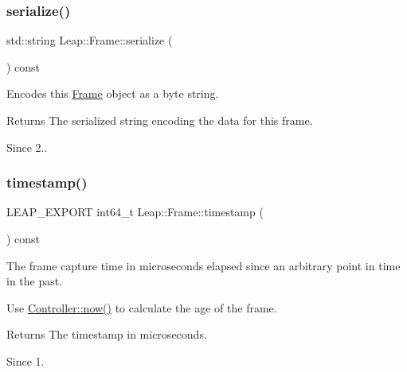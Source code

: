 \subsubsection{\texorpdfstring{serialize()}{serialize()}}
{\footnotesize\ttfamily std\+::string Leap\+::\+Frame\+::serialize (\begin{DoxyParamCaption}{ }\end{DoxyParamCaption}) const\hspace{0.3cm}{\ttfamily [inline]}}

Encodes this \hyperlink{class_leap_1_1_frame}{Frame} object as a byte string.


\begin{DoxyCodeInclude}
\end{DoxyCodeInclude}


\begin{DoxyReturn}{Returns}
The serialized string encoding the data for this frame. 
\end{DoxyReturn}
\begin{DoxySince}{Since}
2.. 
\end{DoxySince}
\mbox{\label{class_leap_1_1_frame_a4bcd369dfb07662f074d3fb36902ac70}} 
\subsubsection{\texorpdfstring{timestamp()}{timestamp()}}
{\footnotesize\ttfamily L\+E\+A\+P\+\_\+\+E\+X\+P\+O\+RT int64\+\_\+t Leap\+::\+Frame\+::timestamp (\begin{DoxyParamCaption}{ }\end{DoxyParamCaption}) const}

The frame capture time in microseconds elapsed since an arbitrary point in time in the past.

Use \hyperlink{class_leap_1_1_controller_a2ffddad8225cfb99452d3f62ae3f7e77}{Controller\+::now()} to calculate the age of the frame.


\begin{DoxyCodeInclude}
\end{DoxyCodeInclude}


\begin{DoxyReturn}{Returns}
The timestamp in microseconds. 
\end{DoxyReturn}
\begin{DoxySince}{Since}
1. 
\end{DoxySince}
\mbox{\label{class_leap_1_1_frame_a161325a08290ab7aec4d335f1a169ad3}} 
